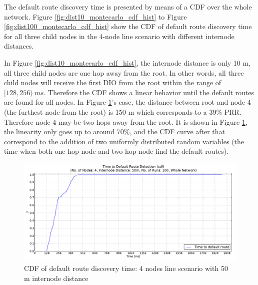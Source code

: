 The default route discovery time is presented by means of a CDF over the whole network. Figure \ref{fig:dist10_montecarlo_cdf_hist} to Figure \ref{fig:dist100_montecarlo_cdf_hist} show the CDF of default route discovery time for all three child nodes in the 4-node line scenario with different internode distances.

In Figure \ref{fig:dist10_montecarlo_cdf_hist}, the internode distance is only 10 m, all three child nodes are one hop away from the root. In other words, all three child nodes will receive the first DIO from the root within the range of $[128, 256)\:ms$. Therefore the CDF shows a linear behavior until the default routes are found for all nodes. In Figure \ref{fig:dist50_montecarlo_cdf_hist}\@'s case, the distance between root and node 4 (the furthest node from the root) is 150 m which corresponds to a 39\% PRR. Therefore node 4 may be two hops away from the root. It is shown in Figure \ref{fig:dist50_montecarlo_cdf_hist}, the linearity only goes up to around 70\%, and the CDF curve after that correspond to the addition of two uniformly distributed random variables (the time when both one-hop node and two-hop node find the default routes).  

\begin{figure}[htbp]
  \begin{center}
    \leavevmode
      \includegraphics[scale=0.38]
      {Pics/results/4/MRHOF/line/dist50_montecarlo_cdf_hist.pdf}
   \caption{CDF of default route discovery time: 4 nodes line scenario with 50 m internode distance}
    \label{fig:dist50_montecarlo_cdf_hist}
  \end{center}
   \vspace{-20pt}
\end{figure}
  
